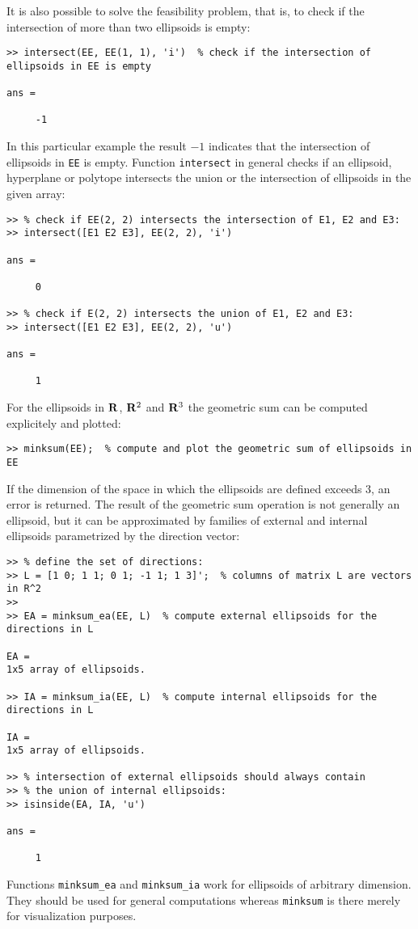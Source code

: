 It is also possible to solve the feasibility problem, that is, to check
if the intersection of more than two ellipsoids is empty:
{\tt \begin{verbatim}
>> intersect(EE, EE(1, 1), 'i')  % check if the intersection of ellipsoids in EE is empty

ans =

     -1
\end{verbatim} }
In this particular example the result $-1$ indicates that the intersection
of ellipsoids in {\tt EE} is empty.
Function {\tt intersect} in general checks if an ellipsoid,
hyperplane or polytope intersects the union or the intersection
of ellipsoids in the given array:
{\tt \begin{verbatim}
>> % check if EE(2, 2) intersects the intersection of E1, E2 and E3:
>> intersect([E1 E2 E3], EE(2, 2), 'i')

ans =

     0

>> % check if E(2, 2) intersects the union of E1, E2 and E3:
>> intersect([E1 E2 E3], EE(2, 2), 'u')

ans =

     1
\end{verbatim} }
For the ellipsoids in ${\bf R}$, ${\bf R}^2$ and ${\bf R}^3$ the geometric
sum can be computed explicitely and plotted:
{\tt \begin{verbatim}
>> minksum(EE);  % compute and plot the geometric sum of ellipsoids in EE
\end{verbatim} }
If the dimension of the space in which the ellipsoids are defined exceeds $3$,
an error is returned. The result of the geometric sum operation is
not generally an ellipsoid, but it can be approximated by families
of external and internal ellipsoids parametrized by the direction vector:
{\tt \begin{verbatim}
>> % define the set of directions:
>> L = [1 0; 1 1; 0 1; -1 1; 1 3]';  % columns of matrix L are vectors in R^2
>>
>> EA = minksum_ea(EE, L)  % compute external ellipsoids for the directions in L

EA =
1x5 array of ellipsoids.

>> IA = minksum_ia(EE, L)  % compute internal ellipsoids for the directions in L

IA =
1x5 array of ellipsoids.

>> % intersection of external ellipsoids should always contain
>> % the union of internal ellipsoids:
>> isinside(EA, IA, 'u')

ans =

     1
\end{verbatim} }
Functions {\tt minksum\_ea} and {\tt minksum\_ia} work for ellipsoids of
arbitrary dimension. They should be used for general computations
whereas {\tt minksum} is there merely for visualization purposes.

